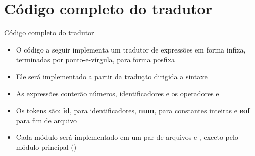 \section{Código completo do tradutor}

\begin{frame}[fragile]{Código completo do tradutor}

    \begin{itemize}
        \item O código a seguir implementa um tradutor de expressões em forma infixa, terminadas por ponto-e-vírgula, para forma posfixa
        \pause

        \item Ele será implementado a partir da tradução dirigida a sintaxe
        \pause

        \item As expressões conterão números, identificadores e os operadores  e 
        \pause

        \item Os tokens são: \textbf{id}, para identificadores, \textbf{num}, para constantes inteiras e \textbf{eof} para fim de arquivo
        \pause
        
        \item Cada módulo será implementado em um par de arquivos  e , exceto pelo módulo principal ()
    \end{itemize}

\end{frame}

